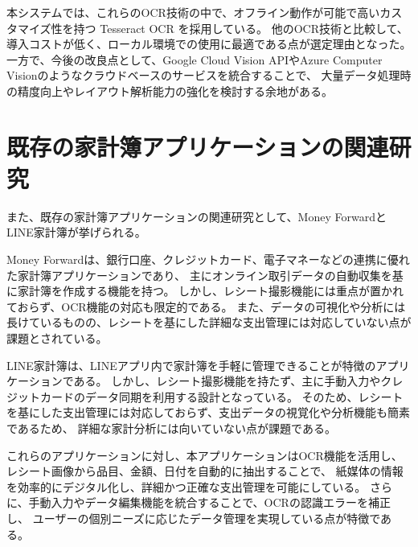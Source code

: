 \documentclass[main]{subfiles}
\begin{document}
本システムでは、これらのOCR技術の中で、オフライン動作が可能で高いカスタマイズ性を持つ Tesseract OCR を採用している。
他のOCR技術と比較して、導入コストが低く、ローカル環境での使用に最適である点が選定理由となった。
一方で、今後の改良点として、Google Cloud Vision APIやAzure Computer Visionのようなクラウドベースのサービスを統合することで、
大量データ処理時の精度向上やレイアウト解析能力の強化を検討する余地がある。

\section{既存の家計簿アプリケーションの関連研究}

また、既存の家計簿アプリケーションの関連研究として、Money ForwardとLINE家計簿が挙げられる。

Money Forwardは、銀行口座、クレジットカード、電子マネーなどの連携に優れた家計簿アプリケーションであり、
主にオンライン取引データの自動収集を基に家計簿を作成する機能を持つ。
しかし、レシート撮影機能には重点が置かれておらず、OCR機能の対応も限定的である。
また、データの可視化や分析には長けているものの、レシートを基にした詳細な支出管理には対応していない点が課題とされている\cite{MoneyForwardApp}。

LINE家計簿は、LINEアプリ内で家計簿を手軽に管理できることが特徴のアプリケーションである。
しかし、レシート撮影機能を持たず、主に手動入力やクレジットカードのデータ同期を利用する設計となっている。
そのため、レシートを基にした支出管理には対応しておらず、支出データの視覚化や分析機能も簡素であるため、
詳細な家計分析には向いていない点が課題である\cite{LINEKakeibo}。

これらのアプリケーションに対し、本アプリケーションはOCR機能を活用し、レシート画像から品目、金額、日付を自動的に抽出することで、
紙媒体の情報を効率的にデジタル化し、詳細かつ正確な支出管理を可能にしている。
さらに、手動入力やデータ編集機能を統合することで、OCRの認識エラーを補正し、
ユーザーの個別ニーズに応じたデータ管理を実現している点が特徴である。
\end{document}
